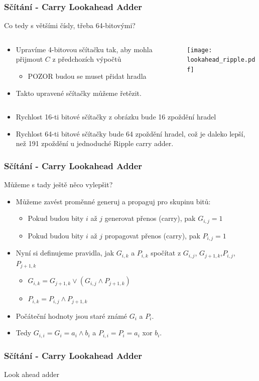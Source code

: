\documentclass{beamer}
\begin{document}
\begin{frame}
\frametitle{Sčítání - Carry Lookahead Adder}

Co tedy s většími čísly, třeba 64-bitovými?

\begin{columns}
\begin{column}{0.45\textwidth}
\begin{itemize}
\item Upravíme 4-bitovou sčítačku tak, aby mohla přijmout $C$ z předchozích výpočtů
\begin{itemize}
\item POZOR budou se muset přidat hradla
\end{itemize}
\item Takto upravené sčítačky můžeme řetězit.
\end{itemize}
\end{column}
\begin{column}{0.55\textwidth}
\begin{center}
   \texttt{[image: lookahead\_ripple.pdf]}
\end{center}
\end{column}
\end{columns}


\begin{itemize}
\item Rychlost 16-ti bitové sčítačky z obrázku bude 16 zpoždění hradel
\item Rychlost 64-ti bitové sčítačky bude 64 zpoždění hradel, což je daleko lepší, než 191 zpoždění u jednoduché Ripple carry adder.
\end{itemize}

\end{frame}



\begin{frame}
\frametitle{Sčítání - Carry Lookahead Adder}

Můžeme s tady ještě něco vylepšit?
\begin{itemize}
\item Můžeme zavést proměnné generuj a propaguj pro skupinu bitů:
\begin{itemize}
\item Pokud budou bity $i$ až $j$ generovat přenos (carry), pak $G_{i,j}=1$
\item Pokud budou bity $i$ až $j$ propagovat přenos (carry), pak $P_{i,j}=1$
\end{itemize}
\item Nyní si definujeme pravidla, jak $G_{i,k}$ a $P_{i,k}$ spočítat z $G_{i,j}$, $G_{j+1,k}$,$P_{i,j}$, $P_{j+1,k}$
\begin{itemize}
\item $G_{i,k}=G_{j+1,k} \lor (G_{i,j} \land P_{j+1,k})$
\item $P_{i,k}=P_{i,j} \land P_{j+1,k}$
\end{itemize}
\item Počáteční hodnoty jsou staré známé $G_i$ a $P_i$. 
\item Tedy $G_{i,i}=G_i=a_i \land b_i$ a $P_{i,i}=P_i=a_i$ xor $b_i$.
\end{itemize}

\end{frame}

\begin{frame}
\frametitle{Sčítání - Carry Lookahead Adder}

Look ahead adder
\end{frame}
\end{document}
